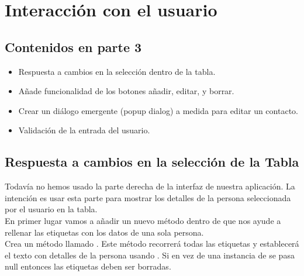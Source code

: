 \chapter{Interacción con el usuario}

\section{Contenidos en parte 3}
\begin{itemize}
    \item Respuesta a cambios en la selección dentro de la tabla.
    \item Añade funcionalidad de los botones añadir, editar, y borrar.
    \item Crear un diálogo emergente (popup dialog) a medida para editar un contacto.
    \item Validación de la entrada del usuario.
\end{itemize}

\section{Respuesta a cambios en la selección de la Tabla}
Todavía no hemos usado la parte derecha de la interfaz de nuestra aplicación. 
La intención es usar esta parte para mostrar los detalles de la persona seleccionada por 
el usuario en la tabla. \\
En primer lugar vamos a añadir un nuevo método dentro de  que nos ayude a 
rellenar las etiquetas con los datos de una sola persona. \\

Crea un método llamado . Este método recorrerá todas las etiquetas y 
establecerá el texto con detalles de la persona usando . Si en vez de una instancia de 
 se pasa null entonces las etiquetas deben ser borradas. \\

